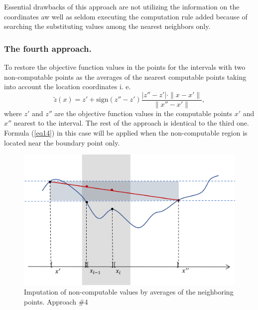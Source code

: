 \documentclass[runningheads]{llncs}
\begin{document}
Essential drawbacks of this approach are not utilizing the information on the coordinates aw well as seldom executing the computation rule added because of searching the substituting values among the nearest neighbors only.

\subsubsection{The fourth approach.} To restore the objective function values in the points for the intervals with two non-computable points as the averages of the nearest computable points taking into account the location coordinates i. e.
\begin{equation}\label{eq17} 
\tilde{z}(x)=z'+ \text{sign}(z''-z') \frac {|z''-z'| \cdot \| x-x' \|}{\| x''-x' \|},
\end{equation}
where $z'$ and $z''$ are the objective function values in the computable points $x'$ and $x''$  nearest to the interval.
The rest of the approach is identical to the third one. Formula (\ref{eq14}) in this case will be applied when the non-computable region is located near the boundary point only.
\begin{figure}
\includegraphics[width=\textwidth]{fig4.png}
\caption{Imputation of non-computable values by averages of the neighboring points. Approach \#4} \label{fig4}
\end{figure}
\end{document}

